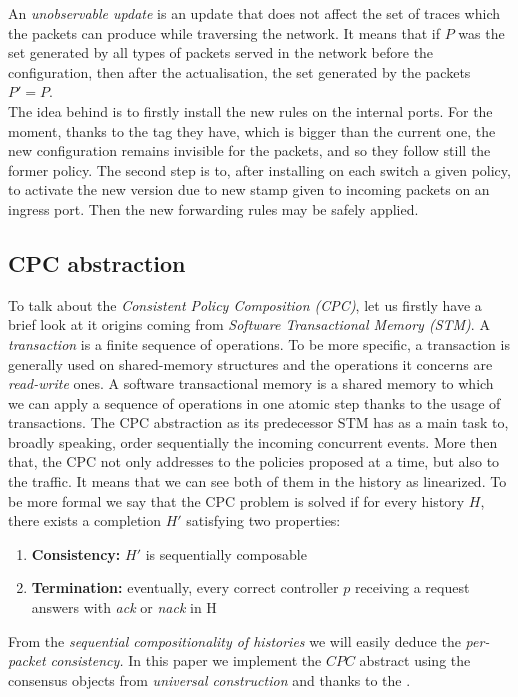 \documentclass{article}
\theoremstyle{remark}
\begin{document}
An \emph{unobservable update} is an update that does not affect the set of traces which the packets can produce while traversing the network. It means that if $P$ was the set generated by all types of packets served in the network before the configuration, then after the actualisation, the set generated by the packets $P'=P$.\\ 
The idea behind is to firstly install the new rules on the internal ports. For the moment, thanks to the tag they have, which is bigger than the current one, the new configuration remains invisible for the packets, and so they follow still the former policy. The second step is to, after installing on each switch a given policy, to activate the new version due to new stamp given to incoming packets on an ingress port. Then the new forwarding rules may be safely applied. 
\subsection{CPC abstraction}
To talk about the \emph{Consistent Policy Composition (CPC)}, let us firstly have a brief look at it origins coming from \emph{Software Transactional Memory (STM)}\cite{Shavit:1995:STM:224964.224987}. A \emph{transaction} is a finite sequence of operations. To be more specific, a transaction is generally used on shared-memory structures and the operations it concerns are \emph{read-write} ones. A software transactional memory is a shared memory to which we can apply a sequence of operations in one atomic step thanks to the usage of transactions.
The CPC abstraction as its predecessor STM has as a main task to, broadly speaking, order sequentially the incoming concurrent events. More then that, the CPC not only addresses to the policies proposed at a time, but also to the traffic. It means that we can see both of them in the history as linearized. To be more formal we say that the CPC problem is solved if for every history $H$, there exists a completion $H'$ satisfying two properties:
\begin{enumerate}
\item \textbf{Consistency:} $H'$ is sequentially composable
\item \textbf{Termination:} eventually, every correct controller $p$ receiving a request answers with \emph{ack} or \emph{nack} in H
\end{enumerate}
From the \emph{sequential compositionality of histories} we will easily deduce the \emph{per-packet consistency.} 
In this paper we implement the $CPC$ abstract using the consensus objects from \emph{universal construction} and thanks to the .
\end{document}
